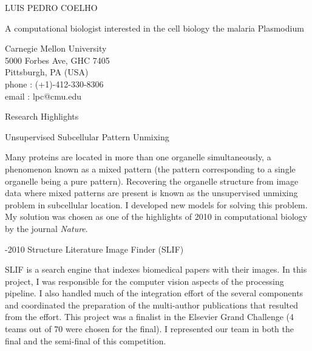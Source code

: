 \documentclass{article}
\renewcommand\section[1]{%
    \par\vspace{2em}%
    {\subhead #1}%
    \par\vspace{1em}%
}
\newcommand\cvitem[2][\relax]{%
    \par\vspace{.8em}
    \if\relax#1\else{\Textsc #1}\hspace{1em}\fi%
    {\Textblack #2}%
    \par\vspace{.4em}
}
\begin{document}
\parindent=0cm

\begin{minipage}[t]{0.60\linewidth}%
\head \textcolor{darkg}{LUIS PEDRO COELHO}

\begin{minipage}[t]{0.70\linewidth}%
\raggedright\Quote\color{darkg} A computational biologist interested in the cell biology the malaria Plasmodium
\end{minipage}
\end{minipage}
\hfill
\begin{minipage}[t]{0.26\textwidth}%
\vspace{-2.2em}

\Text \textcolor{medg}{
Carnegie Mellon University\\
5000 Forbes Ave, GHC 7405\\
Pittsburgh, PA (USA)}\\
\textcolor{darkg}{phone} : (+1)-412-330-8306\\
\textcolor{darkg}{email} : lpc@cmu.edu
\end{minipage}

\vspace{2.3em}

\section{Research Highlights}

\cvitem[2010]{Unsupervised Subcellular Pattern Unmixing}
Many proteins are located in more than one organelle simultaneously, a
phenomenon known as a mixed pattern (the pattern corresponding to a single
organelle being a pure pattern). Recovering the organelle structure from image
data where mixed patterns are present is known as the unsupervised unmixing
problem in subcellular location. I developed new models for
solving this problem. My solution was chosen as one of the highlights of 2010
in computational biology by the journal \emph{Nature}.

\cvitem[2008-2010]{Structure Literature Image Finder (SLIF)}
SLIF is a search engine that indexes biomedical papers with their images. In
this project, I was responsible for the computer vision aspects of the
processing pipeline. I also handled much of the integration effort of the
several components and coordinated the preparation of the multi-author
publications that resulted from the effort. This project was a finalist in the
Elsevier Grand Challenge (4 teams out of 70 were chosen for the final). I
represented our team in both the final and the semi-final of this competition.
\end{document}
